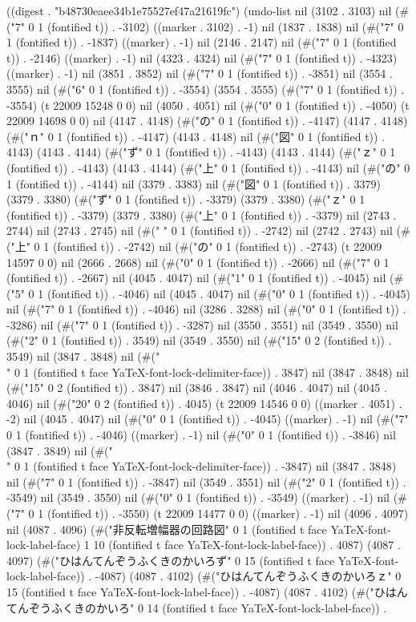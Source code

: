 
((digest . "b48730eaee34b1e75527ef47a21619fc") (undo-list nil (3102 . 3103) nil (#("7" 0 1 (fontified t)) . -3102) ((marker . 3102) . -1) nil (1837 . 1838) nil (#("7" 0 1 (fontified t)) . -1837) ((marker) . -1) nil (2146 . 2147) nil (#("7" 0 1 (fontified t)) . -2146) ((marker) . -1) nil (4323 . 4324) nil (#("7" 0 1 (fontified t)) . -4323) ((marker) . -1) nil (3851 . 3852) nil (#("7" 0 1 (fontified t)) . -3851) nil (3554 . 3555) nil (#("6" 0 1 (fontified t)) . -3554) (3554 . 3555) (#("7" 0 1 (fontified t)) . -3554) (t 22009 15248 0 0) nil (4050 . 4051) nil (#("0" 0 1 (fontified t)) . -4050) (t 22009 14698 0 0) nil (4147 . 4148) (#("の" 0 1 (fontified t)) . -4147) (4147 . 4148) (#("ｎ" 0 1 (fontified t)) . -4147) (4143 . 4148) nil (#("図" 0 1 (fontified t)) . 4143) (4143 . 4144) (#("ず" 0 1 (fontified t)) . -4143) (4143 . 4144) (#("ｚ" 0 1 (fontified t)) . -4143) (4143 . 4144) (#("上" 0 1 (fontified t)) . -4143) nil (#("の" 0 1 (fontified t)) . -4144) nil (3379 . 3383) nil (#("図" 0 1 (fontified t)) . 3379) (3379 . 3380) (#("ず" 0 1 (fontified t)) . -3379) (3379 . 3380) (#("ｚ" 0 1 (fontified t)) . -3379) (3379 . 3380) (#("上" 0 1 (fontified t)) . -3379) nil (2743 . 2744) nil (2743 . 2745) nil (#(" " 0 1 (fontified t)) . -2742) nil (2742 . 2743) nil (#("上" 0 1 (fontified t)) . -2742) nil (#("の" 0 1 (fontified t)) . -2743) (t 22009 14597 0 0) nil (2666 . 2668) nil (#("0" 0 1 (fontified t)) . -2666) nil (#("7" 0 1 (fontified t)) . -2667) nil (4045 . 4047) nil (#("1" 0 1 (fontified t)) . -4045) nil (#("5" 0 1 (fontified t)) . -4046) nil (4045 . 4047) nil (#("0" 0 1 (fontified t)) . -4045) nil (#("7" 0 1 (fontified t)) . -4046) nil (3286 . 3288) nil (#("0" 0 1 (fontified t)) . -3286) nil (#("7" 0 1 (fontified t)) . -3287) nil (3550 . 3551) nil (3549 . 3550) nil (#("2" 0 1 (fontified t)) . 3549) nil (3549 . 3550) nil (#("15" 0 2 (fontified t)) . 3549) nil (3847 . 3848) nil (#("\\" 0 1 (fontified t face YaTeX-font-lock-delimiter-face)) . 3847) nil (3847 . 3848) nil (#("15" 0 2 (fontified t)) . 3847) nil (3846 . 3847) nil (4046 . 4047) nil (4045 . 4046) nil (#("20" 0 2 (fontified t)) . 4045) (t 22009 14546 0 0) ((marker . 4051) . -2) nil (4045 . 4047) nil (#("0" 0 1 (fontified t)) . -4045) ((marker) . -1) nil (#("7" 0 1 (fontified t)) . -4046) ((marker) . -1) nil (#("0" 0 1 (fontified t)) . -3846) nil (3847 . 3849) nil (#("\\" 0 1 (fontified t face YaTeX-font-lock-delimiter-face)) . -3847) nil (3847 . 3848) nil (#("7" 0 1 (fontified t)) . -3847) nil (3549 . 3551) nil (#("2" 0 1 (fontified t)) . -3549) nil (3549 . 3550) nil (#("0" 0 1 (fontified t)) . -3549) ((marker) . -1) nil (#("7" 0 1 (fontified t)) . -3550) (t 22009 14477 0 0) ((marker) . -1) nil (4096 . 4097) nil (4087 . 4096) (#("非反転増幅器の回路図" 0 1 (fontified t face YaTeX-font-lock-label-face) 1 10 (fontified t face YaTeX-font-lock-label-face)) . 4087) (4087 . 4097) (#("ひはんてんぞうふくきのかいろず" 0 15 (fontified t face YaTeX-font-lock-label-face)) . -4087) (4087 . 4102) (#("ひはんてんぞうふくきのかいろｚ" 0 15 (fontified t face YaTeX-font-lock-label-face)) . -4087) (4087 . 4102) (#("ひはんてんぞうふくきのかいろ" 0 14 (fontified t face YaTeX-font-lock-label-face)) . 